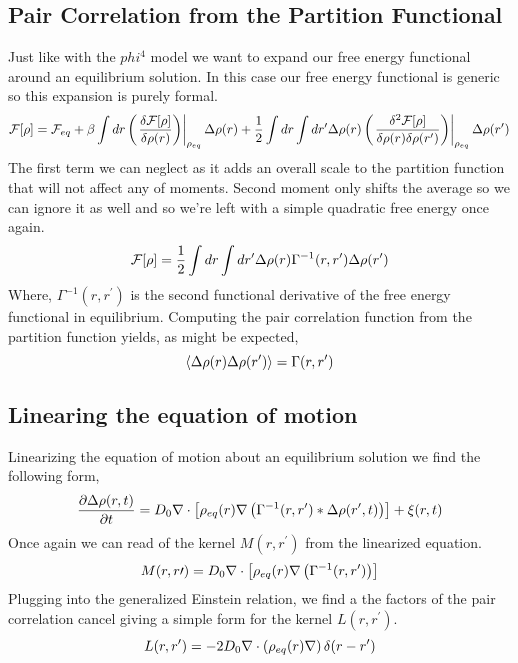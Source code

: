 \subsection{Pair Correlation from the Partition Functional} %

Just like with the $phi^4$ model we want to expand our free energy functional
around an equilibrium solution. In this case our free energy functional is
generic so this expansion is purely formal.
%
\begin{equation} \mathcal{F}[\rho] = \mathcal{F}_{eq} + \beta\int dr \left(\left.\frac{\delta \mathcal{F}[\rho]}{\delta
\rho(r)}\right)\right\vert_{\rho_{eq}}\Delta\rho(r) + \frac{1}{2} \int dr \int dr^\prime
\Delta\rho(r) \left(\left.\frac{\delta^2 \mathcal{F}[\rho]}{\delta \rho(r) \delta
\rho(r^\prime)}\right)\right\vert_{\rho_{eq}} \Delta\rho(r^\prime) \end{equation}
%
The first term we can neglect as it adds an overall scale to the partition
function that will not affect any of moments. Second moment only shifts the
average so we can ignore it as well and so we're left with a simple quadratic
free energy once again.
%
\begin{equation} \mathcal{F}[\rho] = \frac{1}{2}\int dr \int dr^\prime \Delta \rho(r)
\Gamma^{-1}(r, r^\prime) \Delta \rho(r^\prime) \end{equation}
%
Where, $\Gamma^{-1}(r, r^\prime)$ is the second functional derivative of the
free energy functional in equilibrium. Computing the pair correlation function
from the partition function yields, as might be expected,
%
\begin{equation} \left\langle \Delta\rho(r) \Delta\rho(r^\prime) \right\rangle =
\Gamma(r, r^\prime) \end{equation}
%
\subsection{Linearing the equation of motion} %

Linearizing the equation of motion about an equilibrium solution we find the
following form,
%
\begin{equation} \frac{\partial \Delta \rho (r, t)}{\partial t} = D_0\nabla \cdot
\left[\rho_{eq}(r)\nabla \left(\Gamma^{-1}(r, r^\prime)\ast \Delta\rho(r^\prime,
t)\right)\right] + \xi(r, t) \end{equation}
%
Once again we can read of the kernel $M(r, r^\prime)$ from the linearized
equation.
%
\begin{equation} M(r, r\prime) = D_0\nabla \cdot \left[\rho_{eq}(r)\nabla
\left(\Gamma^{-1}(r, r^\prime)\right)\right] \end{equation}
%
Plugging into the generalized Einstein relation, we find a the factors of the
pair correlation cancel giving a simple form for the kernel $L(r, r^\prime)$.
%
\begin{equation} L(r, r^\prime) =
-2D_0\nabla\cdot\left(\rho_{eq}(r)\nabla\right)\delta(r - r^\prime) \end{equation}
%

\nocite{Ronis, Fox_and_Uhlenbeck, Lax}

